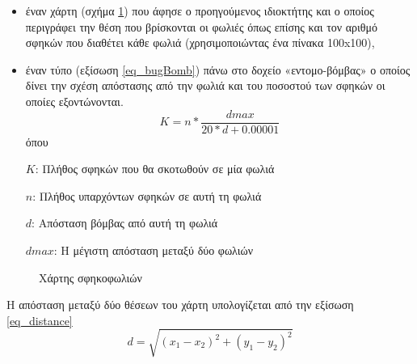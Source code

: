 \begin{itemize}
  \item  έναν χάρτη (σχήμα \ref{fig_waspNestsMap}) που άφησε ο προηγούμενος ιδιοκτήτης και ο οποίος περιγράφει την θέση που βρίσκονται οι φωλιές όπως επίσης και τον αριθμό σφηκών που διαθέτει κάθε φωλιά (χρησιμοποιώντας ένα πίνακα 100x100),
  \item έναν τύπο (εξίσωση \ref{eq_bugBomb}) πάνω στο δοχείο «εντομο-βόμβας» ο οποίος δίνει την σχέση απόστασης από την φωλιά και του ποσοστού των σφηκών οι οποίες εξοντώνονται.
      \begin{equation}\label{eq_bugBomb}
        K = n* \frac{dmax}{20*d+0.00001}
      \end{equation}
      όπου
      
      $K$: Πλήθος σφηκών που θα σκοτωθούν σε μία φωλιά
      
      $n$: Πλήθος υπαρχόντων σφηκών σε αυτή τη φωλιά
      
      $d$: Απόσταση βόμβας από αυτή τη φωλιά
      
      $dmax$: Η μέγιστη απόσταση μεταξύ δύο φωλιών
\end{itemize}

\begin{figure}[!t]
    \centering
    \caption{Χάρτης σφηκοφωλιών}
    \label{fig_waspNestsMap}
\end{figure}

Η απόσταση μεταξύ δύο θέσεων του χάρτη υπολογίζεται από την εξίσωση \ref{eq_distance}
\begin{equation}\label{eq_distance}
    d = \sqrt{(x_{1}-x_{2})^2+(y_{1}-y_{2})^2}
\end{equation}

